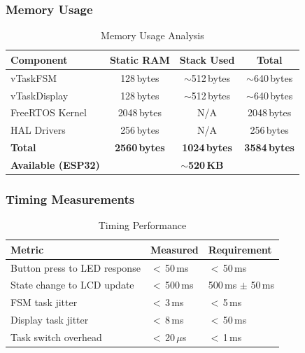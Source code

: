 \documentclass[12pt]{article}
\begin{document}
\subsubsection*{Memory Usage}

\begin{table}[H]
    \centering
    \caption{Memory Usage Analysis}
    \label{tab:memory-usage}
    \begin{tabular}{|l|c|c|c|}
        \hline
        \textbf{Component} & \textbf{Static RAM} & \textbf{Stack Used} & \textbf{Total} \\
        \hline
        vTaskFSM & 128\,bytes & $\sim$512\,bytes & $\sim$640\,bytes \\
        \hline
        vTaskDisplay & 128\,bytes & $\sim$512\,bytes & $\sim$640\,bytes \\
        \hline
        FreeRTOS Kernel & 2048\,bytes & N/A & 2048\,bytes \\
        \hline
        HAL Drivers & 256\,bytes & N/A & 256\,bytes \\
        \hline
        \textbf{Total} & \textbf{2560\,bytes} & \textbf{1024\,bytes} & \textbf{3584\,bytes} \\
        \hline
        \textbf{Available (ESP32)} & \multicolumn{3}{c|}{\textbf{$\sim$520\,KB}} \\
        \hline
    \end{tabular}
\end{table}

\subsubsection*{Timing Measurements}

\begin{table}[H]
    \centering
    \caption{Timing Performance}
    \label{tab:timing-performance}
    \begin{tabular}{|l|l|l|}
        \hline
        \textbf{Metric} & \textbf{Measured} & \textbf{Requirement} \\
        \hline
        Button press to LED response & $<$\,50\,ms & $<$\,50\,ms \\
        \hline
        State change to LCD update & $<$\,500\,ms & 500\,ms $\pm$ 50\,ms \\
        \hline
        FSM task jitter & $<$\,3\,ms & $<$\,5\,ms \\
        \hline
        Display task jitter & $<$\,8\,ms & $<$\,50\,ms \\
        \hline
        Task switch overhead & $<$\,20\,$\mu$s & $<$\,1\,ms \\
        \hline
    \end{tabular}
\end{table}
\end{document}
